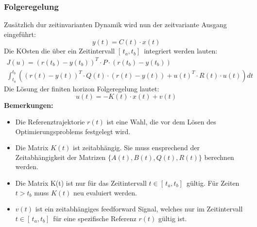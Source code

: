 \subsubsection{Folgeregelung}
Zusätzlich dur zeitinvarianten Dynamik wird nun der zeitvariante Ausgang eingeführt: \[y(t) = C(t) \cdot x(t)\]
Die KOsten die über ein Zeitintervall $[\,t_a,t_b]\,$ integriert werden lauten: \begin{align*}J(u)=(r(t_b)-y(t_b))^T\cdot P\cdot(r(t_b)-y(t_b))\\
\int_{t_a}^{t_b}((r(t)-y(t))^T \cdot Q(t)\cdot (r(t)-y(t))+u(t)^T\cdot R(t) \cdot u(t))dt
\end{align*}
Die Lösung der finiten horizon Folgeregelung lautet: \[u(t) = -K(t)\cdot x(t) + v(t)\]
\textbf{Bemerkungen:}
\begin{itemize}
    \item Die Referenztrajektorie $r(t)$ ist eine Wahl, die vor dem Lösen des Optimierungsproblems festgelegt wird.
    \item Die Matrix $K(t)$ ist zeitabhängig. Sie muss ensprechend der Zeitabhängigkeit der Matrizen $\{A(t),B(t),Q(t),R(t)\}$ berechnen werden. 
    \item Die Matrix K(t) ist nur für das Zeitintervall $t \in [\,t_a,t_b]\,$ gültig. Für Zeiten $t>t_b$ muss $K(t)$ neu evaluiert werden.
    \item $v(t)$ ist ein zeitabhängiges feedforward Signal, welches nur im Zeitintervall $t \in [\,t_a,t_b]\,$ für eine spezifische Referenz $r(t)$ gültig ist.
\end{itemize}